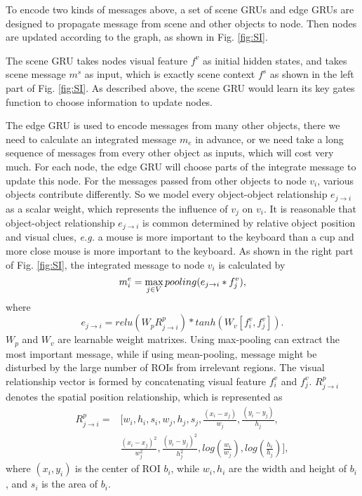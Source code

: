 \documentclass[10pt,twocolumn,letterpaper]{article}
\begin{document}
To encode two kinds of messages above, a set of scene GRUs and edge GRUs are designed to propagate message from scene and other objects to node. Then nodes are updated according to the graph, as shown in Fig. \ref{fig:SI}.

The scene GRU takes nodes visual feature $f^{v}$ as initial hidden states, and takes scene message $m^{s}$ as input, which is exactly scene context $f^s$ as shown in the left part of Fig. \ref{fig:SI}. As described above, the scene GRU would learn its key gates function to choose information to update nodes.

The edge GRU is used to encode messages from many other objects, there we need to calculate an integrated message $m_e$ in advance, or we need take a long sequence of messages from every other object as inputs, which will cost very much. For each node, the edge GRU will choose parts of the integrate message to update this node. For the messages passed from other objects to node $v_i$, various objects contribute differently. So we model every object-object relationship $e_{j\to i}$ as a scalar weight, which represents the influence of $v_j$ on $v_i$. It is reasonable that object-object relationship $e_{j\to i}$ is common determined by relative object position and visual clues, {\em e.g.} a mouse is more important to the keyboard than a cup and more close mouse is more important to the keyboard. As shown in the right part of Fig. \ref{fig:SI}, the integrated message to node $v_i$ is calculated by 
\begin{equation}
m^e_{i} = \max_{j \in V} pooling(e_{j \to i}* f^v_j) ,
\vspace{-1ex}
\end{equation}
where
\vspace{-1ex}
\begin{equation}
e_{j\to i} = relu(W_pR^p_{j\to i}) * tanh(W_v[f^v_i, f^v_j]) .
\end{equation}
$W_p$ and $W_v$ are learnable weight matrixes. Using max-pooling can extract the most important message, while if using mean-pooling, message might be disturbed by the large number of ROIs from irrelevant regions. The visual relationship vector is formed by concatenating visual feature $f^v_i$ and $f^v_j$. $R^p_{j\to i}$ denotes the spatial position relationship, which is represented as 
\begin{equation}
\begin{split}
R^p_{j \to i} = & [w_i, h_i, s_i, w_j, h_j, s_j, \frac{(x_i - x_j)}{w_j} ,\frac{(y_i - y_j)}{h_j}, \\& \frac{(x_i - x_j)^2}{w_j^2}, \frac{(y_i - y_j)^2}{h_j^2}, log(\frac{w_i}{w_j}), log(\frac{h_i}{h_j})],
\end{split}
\end{equation}
where $(x_i, y_i)$ is the center of ROI $b_i$, while $w_i, h_i$ are the width and height of $b_i$, and $s_i$ is the area of $b_i$.
\end{document}
